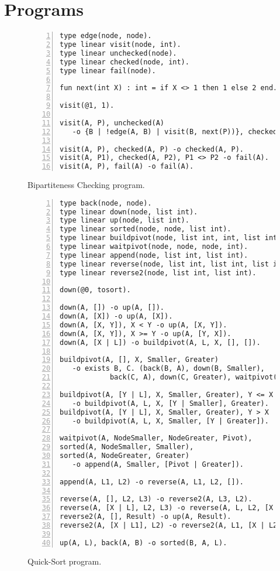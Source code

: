 
\section{Programs}

\begin{figure}[h!]
\footnotesize\begin{Verbatim}[numbers=left]
type edge(node, node).
type linear visit(node, int).
type linear unchecked(node).
type linear checked(node, int).
type linear fail(node).

fun next(int X) : int = if X <> 1 then 1 else 2 end.

visit(@1, 1).

visit(A, P), unchecked(A)
   -o {B | !edge(A, B) | visit(B, next(P))}, checked(A, P).

visit(A, P), checked(A, P) -o checked(A, P).
visit(A, P1), checked(A, P2), P1 <> P2 -o fail(A).
visit(A, P), fail(A) -o fail(A).
\end{Verbatim}
  \caption{Bipartiteness Checking program.}
  \label{code:bichecking}
\end{figure}
\normalsize


\begin{figure}[h!]
\footnotesize\begin{Verbatim}[numbers=left]
type back(node, node).
type linear down(node, list int).
type linear up(node, list int).
type linear sorted(node, node, list int).
type linear buildpivot(node, list int, int, list int, list int).
type linear waitpivot(node, node, node, int).
type linear append(node, list int, list int).
type linear reverse(node, list int, list int, list int).
type linear reverse2(node, list int, list int).

down(@0, tosort).

down(A, []) -o up(A, []).
down(A, [X]) -o up(A, [X]).
down(A, [X, Y]), X < Y -o up(A, [X, Y]).
down(A, [X, Y]), X >= Y -o up(A, [Y, X]).
down(A, [X | L]) -o buildpivot(A, L, X, [], []).

buildpivot(A, [], X, Smaller, Greater)
   -o exists B, C. (back(B, A), down(B, Smaller),
            back(C, A), down(C, Greater), waitpivot(A, B, C, X)).

buildpivot(A, [Y | L], X, Smaller, Greater), Y <= X
   -o buildpivot(A, L, X, [Y | Smaller], Greater).
buildpivot(A, [Y | L], X, Smaller, Greater), Y > X
   -o buildpivot(A, L, X, Smaller, [Y | Greater]).
   
waitpivot(A, NodeSmaller, NodeGreater, Pivot),
sorted(A, NodeSmaller, Smaller),
sorted(A, NodeGreater, Greater)
   -o append(A, Smaller, [Pivot | Greater]).

append(A, L1, L2) -o reverse(A, L1, L2, []).

reverse(A, [], L2, L3) -o reverse2(A, L3, L2).
reverse(A, [X | L], L2, L3) -o reverse(A, L, L2, [X | L3]).
reverse2(A, [], Result) -o up(A, Result).
reverse2(A, [X | L1], L2) -o reverse2(A, L1, [X | L2]).

up(A, L), back(A, B) -o sorted(B, A, L).
\end{Verbatim}
  \caption{Quick-Sort program.}
  \label{code:quicksort}
\end{figure}
\normalsize


